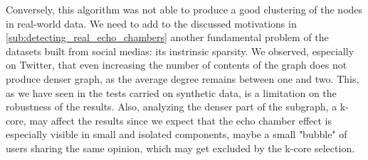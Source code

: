 Conversely, this algorithm was not able to produce a good clustering of the
nodes in real-world data. We need to add to the discussed motivations in
\autoref{sub:detecting_real_echo_chambers} another fundamental problem of the
datasets built from social medias: its instrinsic sparsity. We observed,
especially on Twitter, that even increasing the number of contents of the graph
does not produce denser graph, as the average degree remains between one and
two. This, as we have seen in the tests carried on synthetic data, is a limitation
on the robustness of the results. Also, analyzing the denser part of the
subgraph, a k-core, may affect the results since we expect that the echo chamber
effect is especially visible in small and isolated components, maybe a small
"bubble" of users sharing the same opinion, which may get excluded by
the k-core selection.
